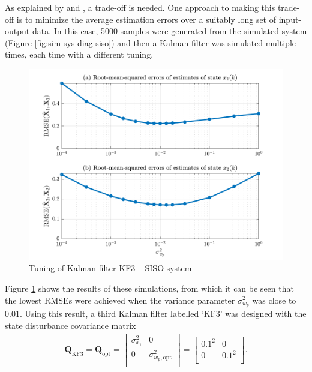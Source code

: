 As explained by \cite{andersson_adaptive_1985} and \cite{robertson_detection_1995}, a trade-off is needed. One approach to making this trade-off is to minimize the average estimation errors over a suitably long set of input-output data. In this case, 5000 samples were generated from the simulated system (Figure \ref{fig:sim-sys-diag-siso}) and then a Kalman filter was simulated multiple times, each time with a different tuning. 
\begin{figure}[htp]
	\centering
	\includegraphics[width=13cm]{images/rod_obs_sim1_3KF_Q_seed_6.pdf}
	\caption{Tuning of Kalman filter KF3 – SISO system}
	\label{fig:sim-sys-siso-KF3-tuning}
\end{figure}
Figure \ref{fig:sim-sys-siso-KF3-tuning} shows the results of these simulations, from which it can be seen that the lowest \gls{RMSE}s were achieved when the variance parameter $\sigma_{w_p}^2$ was close to $0.01$. Using this result, a third Kalman filter labelled `KF3' was designed with the state disturbance covariance matrix 
\begin{equation} \label{eq:sim-sys-siso-KF3-Q}
	\begin{aligned}
		\mathbf{Q}_{\text{KF3}}=\mathbf{Q}_{\text{opt}}=\begin{bmatrix}
			\sigma_{x_1}^2 & 0 \\
			0 & \sigma_{w_p,\text{opt}}^2 \\
		\end{bmatrix}=\begin{bmatrix}
			0.1^2 & 0 \\
			0 & 0.1^2 \\
		\end{bmatrix}.
	\end{aligned}
\end{equation}

